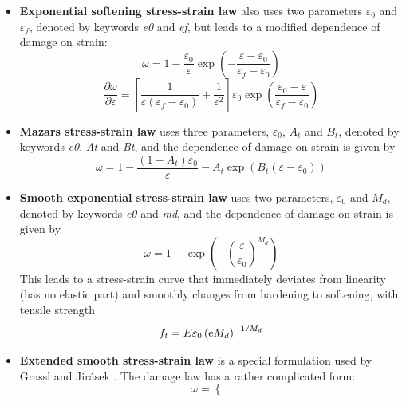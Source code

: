 \documentclass[a4paper]{article}
\begin{document}
\begin{itemize}
{\bf Linear softening stress-strain law} works directly with strain
and does not make any adjustment for the element size. The specified
parameters $\varepsilon_0$ and $\varepsilon_f$, denoted by keywords {\it e0}
and {\it ef}, have the meaning of (equivalent) strain at peak stress and at
complete failure. The linear relation between stress and strain on the
softening branch is obtained with the damage law
$$
\omega =\frac{\varepsilon_f}{\varepsilon_f-\varepsilon_0}\left(1-\frac{\varepsilon_0}{\varepsilon}\right)
$$
Again, to cover general conditions, $\varepsilon$ is replaced by $\kappa$.
$$
\frac{\partial\omega}{\partial\varepsilon} = \frac{\varepsilon_0 \varepsilon_f}{\varepsilon^2 ( \varepsilon_f - \varepsilon_0 )}
$$
\item
{\bf Exponential softening stress-strain law} also uses two parameters
 $\varepsilon_0$ and $\varepsilon_f$, denoted by keywords {\it e0}
and {\it ef}, but leads to a modified dependence of damage on strain:
$$
\omega =1-\frac{\varepsilon_0}{\varepsilon}\exp\left(-\frac{\varepsilon-\varepsilon_0}{\varepsilon_f-\varepsilon_0}\right)
$$
$$
\frac{\partial\omega}{\partial\varepsilon} = \left[ \frac{1}{\varepsilon(\varepsilon_f-\varepsilon_0)} + \frac{1}{\varepsilon^2} \right] \varepsilon_0 \exp \left (\frac{\varepsilon_0-\varepsilon}{\varepsilon_f-\varepsilon_0} \right )
$$
\item
{\bf Mazars stress-strain law} uses three parameters, $\varepsilon_0$,
$A_t$ and $B_t$, denoted by keywords {\it e0}, {\it At} and {\it Bt}, and the
dependence of damage on strain is given by
$$
\omega =1-\frac{(1-A_t)\varepsilon_0}{\varepsilon}-A_t\exp\left(B_t(\varepsilon-\varepsilon_0)\right)
$$
\item
{\bf Smooth exponential stress-strain law} uses two parameters, $\varepsilon_0$
and $M_d$, denoted by keywords {\it e0} and {\it md}, and the
dependence of damage on strain is given by
$$
\omega = 1-\exp\left(-\left(\frac{\varepsilon}{\varepsilon_0}\right)^{M_d}\right)
$$
This leads to a stress-strain curve that immediately deviates from linearity
(has no elastic part) and smoothly changes from hardening to softening,
with tensile strength
$$
f_t = E\varepsilon_0\left({\rm e}M_d\right)^{-1/M_d}
$$
\item
{\bf Extended smooth stress-strain law} is a special formulation used
by Grassl and Jir\'{a}sek \cite{GraJir10}. The damage law has a rather complicated form:
\begin{equation} \label{eq:damageEvol}
\omega = \left \{ \begin{array}{ll} 

\end{array}
\end{equation}
\end{itemize}
\end{document}

